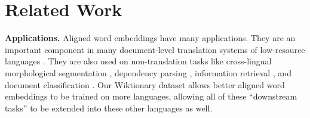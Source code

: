 \documentclass[11pt]{article}
\begin{document}

\section{Related Work}
\label{sec:related-work}


\textbf{Applications.}
Aligned word embeddings have many applications.
They are an important component in many document-level translation systems of low-resource languages \citep{di2017monolingual,neishi2017bag,artetxe2017unsupervised,artetxe2018unsupervised,qi2018and,ding2018source, kim2019improving, xia2019generalized,font2019equalizing,chen2020cross}.
They are also used on non-translation tasks like cross-lingual
morphological segmentation \citep{chimalamarri2020morphological},
dependency parsing \citep{ahmad2018difficulties},
information retrieval \citep{vulic2015monolingual},
and document classification \citep{klementiev2012inducing,mogadala2016bilingual}.
Our Wiktionary dataset allows better aligned word embeddings to be trained on more languages,
allowing all of these ``downstream tasks'' to be extended into these other languages as well.

\end{document}
